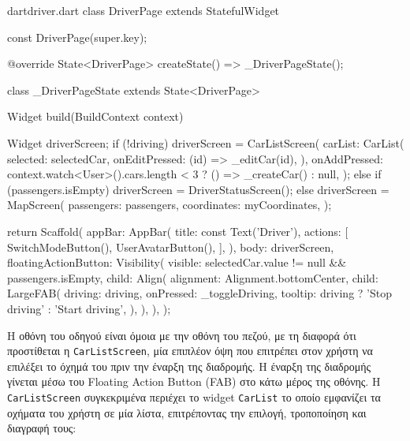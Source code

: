 \documentclass[../thesis.tex]{subfiles}
\begin{document}
\begin{codeblock}{dart}{driver.dart}
  class DriverPage extends StatefulWidget {
    const DriverPage({super.key});

    @override
    State<DriverPage> createState() => _DriverPageState();
  }

  class _DriverPageState extends State<DriverPage> {
    Widget build(BuildContext context) {
      Widget driverScreen;
      if (!driving) {
        driverScreen = CarListScreen(
          carList: CarList(
            selected: selectedCar,
            onEditPressed: (id) => _editCar(id),
          ),
          onAddPressed: context.watch<User>().cars.length < 3
              ? () => _createCar()
              : null,
        );
      } else if (passengers.isEmpty) {
        driverScreen = DriverStatusScreen();
      } else {
        driverScreen = MapScreen(
          passengers: passengers,
          coordinates: myCoordinates,
        );
      }

      return Scaffold(
        appBar: AppBar(
          title: const Text('Driver'),
          actions: [
            SwitchModeButton(),
            UserAvatarButton(),
          ],
        ),
        body: driverScreen,
        floatingActionButton: Visibility(
          visible: selectedCar.value != null && passengers.isEmpty,
          child: Align(
            alignment: Alignment.bottomCenter,
            child: LargeFAB(
              driving: driving,
              onPressed: _toggleDriving,
              tooltip: driving ? 'Stop driving' : 'Start driving',
            ),
          ),
        ),
      );
    }
  }
\end{codeblock}

Η οθόνη του οδηγού είναι όμοια με την οθόνη του πεζού, με τη διαφορά ότι προστίθεται η \verb|CarListScreen|, μία επιπλέον όψη που επιτρέπει στον χρήστη να επιλέξει το όχημά του πριν την έναρξη της διαδρομής.
Η έναρξη της διαδρομής γίνεται μέσω του Floating Action Button (FAB) στο κάτω μέρος της οθόνης.
Η \verb|CarListScreen| συγκεκριμένα περιέχει το widget \verb|CarList| το οποίο εμφανίζει τα οχήματα του χρήστη σε μία λίστα, επιτρέποντας την επιλογή, τροποποίηση και διαγραφή τους:
\end{document}
